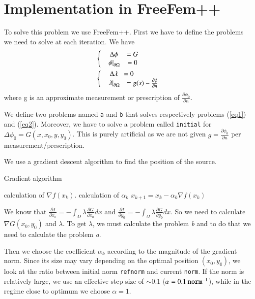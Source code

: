
\section{Implementation in FreeFem++}
To solve this problem we use FreeFem++. First we have to define the problems we need to solve at each iteration. 
We have 
\begin{align}
&\left\lbrace 
	\begin{matrix}\label{eq1}
	& \Delta \phi &= G \\
	& \left. \phi\right|_{\partial\Omega} &= 0
	\end{matrix}
\right.\\
&\left\lbrace 
	\begin{matrix}\label{eq2}
	& \Delta \lambda &\hspace{-40pt}= 0 \\
	& \left. \lambda\right|_{\partial\Omega} &= g(s)-\frac{\partial \phi}{\partial n}
	\end{matrix}
\right.
\end{align}
where g is an approximate measurement or prescription of $\frac{\partial \phi_0}{\partial n}$. 

We define two problems named \verb|a| and \verb|b| that solves respectively problems (\ref{eq1}) and (\ref{eq2}).
Moreover, we have to solve a problem called \verb|initial| for $\Delta \phi_0 = G(x,x_0,y,y_0)$. This is purely artificial as we are not given $g =\frac{\partial \phi_0}{\partial n}$ per measurement/prescription.


We use a gradient descent algorithm to find the position of the source.\\
\begin{algorithm}
\caption{Gradient algorithm}
\begin{algorithmic} 
\STATE calculation of $\nabla f(x_k)$.
\STATE calculation of $\alpha_k$
\STATE $x_{k+1} = x_k - \alpha_k \nabla f(x_k)$
\ENDWHILE
\end{algorithmic}
\end{algorithm}

We know that $\frac{\partial I}{\partial x_0} = -\int_{\Omega}\lambda \frac{\partial G}{\partial x_0} dx$ and $\frac{\partial I}{\partial y_0} = -\int_{\Omega}\lambda \frac{\partial G}{\partial y_0} dx$. So we need to calculate $\nabla G(x_0,y_0)$ and $\lambda$. To get $\lambda$, we must calculate the problem \textit{b} and to do that we need to calculate the problem \textit{a}.

Then we choose the coefficient $\alpha_k$ according to the magnitude of the gradient norm. Since its size may vary depending on the optimal position $(x_0,y_0)$, we look at the ratio between initial norm \verb|refnorm| and current \verb|norm|. If the norm is relatively large, we use an effective step size of $\sim 0.1$ ($\alpha = 0.1\:\verb|norm|^{-1}$), while in the regime close to optimum we choose $\alpha=1$.


